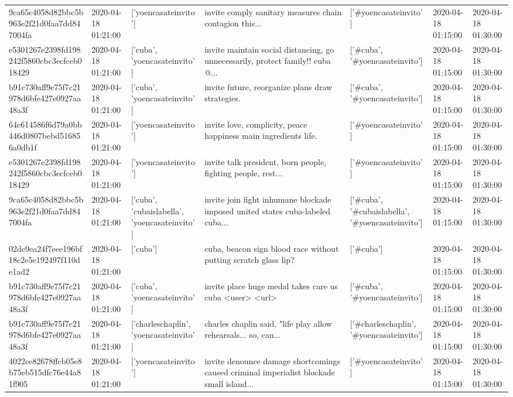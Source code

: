 \begin{tabular}{lllllll}
9ca65c4058d82bbc5b963e2f21d0faa7dd847004fa & 2020-04-18 01:21:00 & ['yoencasateinvito'] & invite comply sanitary measures chain contagion this... & ['#yoencasateinvito'] & 2020-04-18 01:15:00 & 2020-04-18 01:30:00 \\
e5301267e2398fd198242f5860cbc3ecfceb018429 & 2020-04-18 01:21:00 & ['cuba', 'yoencasateinvito'] & invite maintain social distancing, go unnecessarily, protect family!!️ cuba @... & ['#cuba', '#yoencasateinvito'] & 2020-04-18 01:15:00 & 2020-04-18 01:30:00 \\
b91c730aff9e75f7c21978d6bfe427e0927aa48a3f & 2020-04-18 01:21:00 & ['cuba', 'yoencasateinvito'] & invite future, reorganize plans draw strategies. & ['#cuba', '#yoencasateinvito'] & 2020-04-18 01:15:00 & 2020-04-18 01:30:00 \\
64c614586f6d79a0bb446d0807bebd516856a0db1f & 2020-04-18 01:21:00 & ['yoencasateinvito'] & invite love, complicity, peace happiness main ingredients life. & ['#yoencasateinvito'] & 2020-04-18 01:15:00 & 2020-04-18 01:30:00 \\
e5301267e2398fd198242f5860cbc3ecfceb018429 & 2020-04-18 01:21:00 & ['yoencasateinvito'] & invite talk president, born people, fighting people, rest... & ['#yoencasateinvito'] & 2020-04-18 01:15:00 & 2020-04-18 01:30:00 \\
9ca65c4058d82bbc5b963e2f21d0faa7dd847004fa & 2020-04-18 01:21:00 & ['cuba', 'cubaislabella', 'yoencasateinvito'] & invite join fight inhumane blockade imposed united states cuba-labeled cuba... & ['#cuba', '#cubaislabella', '#yoencasateinvito'] & 2020-04-18 01:15:00 & 2020-04-18 01:30:00 \\
02de9ea24f7eee196bf18c2e5e192497f110de1ad2 & 2020-04-18 01:21:00 & ['cuba'] & cuba, beacon sign blood race without putting scratch glass lip? & ['#cuba'] & 2020-04-18 01:15:00 & 2020-04-18 01:30:00 \\
b91c730aff9e75f7c21978d6bfe427e0927aa48a3f & 2020-04-18 01:21:00 & ['cuba', 'yoencasateinvito'] & invite place huge medal takes care us cuba <user> <url> & ['#cuba', '#yoencasateinvito'] & 2020-04-18 01:15:00 & 2020-04-18 01:30:00 \\
b91c730aff9e75f7c21978d6bfe427e0927aa48a3f & 2020-04-18 01:21:00 & ['charleschaplin', 'yoencasateinvito'] & charles chaplin said, "life play allow rehearsals... so, can... & ['#charleschaplin', '#yoencasateinvito'] & 2020-04-18 01:15:00 & 2020-04-18 01:30:00 \\
4022ee82678ffcb05e8b75eb515dfc76e44a81f905 & 2020-04-18 01:21:00 & ['yoencasateinvito'] & invite denounce damage shortcomings caused criminal imperialist blockade small island... & ['#yoencasateinvito'] & 2020-04-18 01:15:00 & 2020-04-18 01:30:00 \\

\end{tabular}
